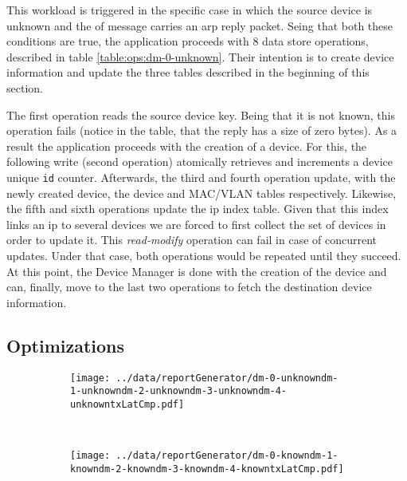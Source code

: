 {This workload is triggered in the specific case in which  the source device
is unknown and the \gls{of} message carries an \gls{arp} reply 
packet. Seing that both these  conditions are true, the application
proceeds  with 8 data store operations, described in table
\ref{table:ops:dm-0-unknown}. Their intention is to create device
information and update the three tables described  in the beginning
of this section.  

The first operation reads the  source device key. Being
that it is not known, this operation fails (notice in the table, that
the reply has a size  of zero bytes). As a result the application
proceeds with the creation of a device. For this, the
following write (second operation) atomically retrieves
and increments a device unique \texttt{id} counter. Afterwards, the third and fourth  operation
update, with the newly created device, the device and MAC/VLAN
tables respectively. Likewise, the fifth and sixth operations update
the \gls{ip} index table. Given that this index links an \gls{ip} to
several devices we are forced to first collect the set of devices in
order to update it. This \emph{read-modify} operation can
fail in case of concurrent updates. Under that case, both operations
would be repeated until they succeed. At this point, the Device Manager
is done with the creation of the device and can, finally, move to the
last two operations to fetch the destination device information. 

\subsection{Optimizations}
\begin{figure}
  \centering
  \begin{subfigure}[b]{0.5\textwidth}
                \centering
                \texttt{[image: ../data/reportGenerator/dm-0-unknowndm-1-unknowndm-2-unknowndm-3-unknowndm-4-unknowntxLatCmp.pdf]}
                \caption{}
                \label{fig:}
        \end{subfigure}%
        ~
        \begin{subfigure}[b]{0.5\textwidth}
                \centering
                \texttt{[image: ../data/reportGenerator/dm-0-knowndm-1-knowndm-2-knowndm-3-knowndm-4-knowntxLatCmp.pdf]}
                \caption{}
                \label{}
        \end{subfigure}
        \caption[Device Manager performance analysis]{}
        \label{fig:dm:performance}
\end{figure}

}
